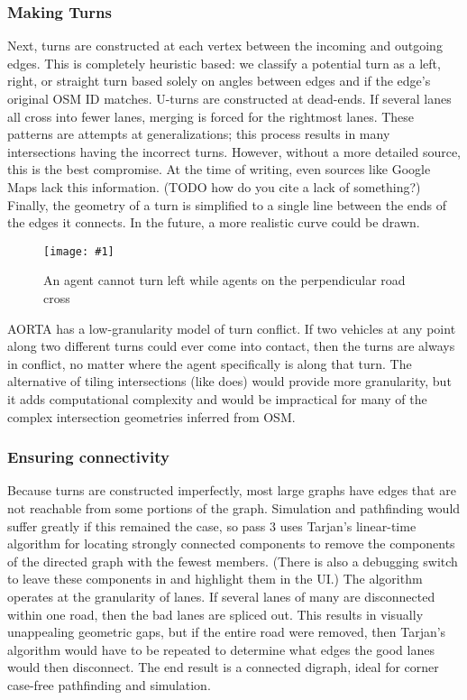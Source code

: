 \documentclass[letterpaper, 10 pt, conference]{ieeeconf}  %
\newcommand{\pix}[3]{
  \begin{figure}[h]
    \centering \texttt{[image: \#1]}
    \caption{#2}
  \end{figure}
}
\begin{document}
\subsubsection{Making Turns}

Next, turns are constructed at each vertex between the incoming and outgoing
edges. This is completely heuristic based: we classify a potential turn as a
left, right, or straight turn based solely on angles between edges and if the
edge's original OSM ID matches. U-turns are constructed at dead-ends. If several
lanes all cross into fewer lanes, merging is forced for the rightmost lanes.
These patterns are attempts at generalizations; this process results in many
intersections having the incorrect turns. However, without a more detailed
source, this is the best compromise. At the time of writing, even sources like
Google Maps lack this information. (TODO how do you cite a lack of something?)
Finally, the geometry of a turn is simplified to a single line between the ends
of the edges it connects.  In the future, a more realistic curve could be drawn.

\pix{turn_conflicts.png}
    {An agent cannot turn left while agents on the perpendicular road cross}
    {scale=0.5}

AORTA has a low-granularity model of turn conflict. If two vehicles at any point
along two different turns could ever come into contact, then the turns are
always in conflict, no matter where the agent specifically is along that turn.
The alternative of tiling intersections (like \cite{JAIR08-dresner} does) would
provide more granularity, but it adds computational complexity and would be
impractical for many of the complex intersection geometries inferred from OSM.

\subsubsection{Ensuring connectivity}

Because turns are constructed imperfectly, most large graphs have edges that are
not reachable from some portions of the graph. Simulation and pathfinding would
suffer greatly if this remained the case, so pass 3 uses Tarjan's linear-time
algorithm for locating strongly connected components to remove the components of
the directed graph with the fewest members. (There is also a debugging switch to
leave these components in and highlight them in the UI.) The algorithm operates
at the granularity of lanes. If several lanes of many are disconnected within
one road, then the bad lanes are spliced out. This results in visually
unappealing geometric gaps, but if the entire road were removed, then Tarjan's
algorithm would have to be repeated to determine what edges the good lanes would
then disconnect. The end result is a connected digraph, ideal for corner
case-free pathfinding and simulation.
\end{document}

